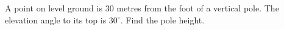 A point on level ground is 30 metres from the foot of a vertical pole. The elevation angle to its top is $30^\circ$. Find the pole height.
